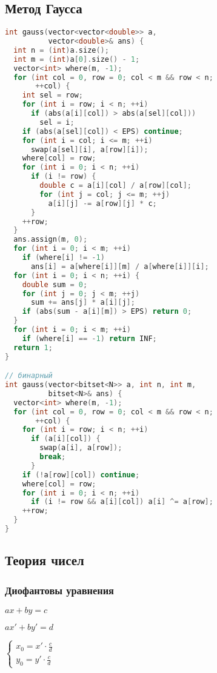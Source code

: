 \documentclass[10pt,a4paper,landscape,twosided]{extarticle}
\begin{document}
\begin{multicols}{3}
\subsection{Метод Гаусса}
\begin{lstlisting}[language=C++]
int gauss(vector<vector<double>> a,
          vector<double>& ans) {
  int n = (int)a.size();
  int m = (int)a[0].size() - 1;
  vector<int> where(m, -1);
  for (int col = 0, row = 0; col < m && row < n;
       ++col) {
    int sel = row;
    for (int i = row; i < n; ++i)
      if (abs(a[i][col]) > abs(a[sel][col]))
        sel = i;
    if (abs(a[sel][col]) < EPS) continue;
    for (int i = col; i <= m; ++i)
      swap(a[sel][i], a[row][i]);
    where[col] = row;
    for (int i = 0; i < n; ++i)
      if (i != row) {
        double c = a[i][col] / a[row][col];
        for (int j = col; j <= m; ++j)
          a[i][j] -= a[row][j] * c;
      }
    ++row;
  }
  ans.assign(m, 0);
  for (int i = 0; i < m; ++i)
    if (where[i] != -1)
      ans[i] = a[where[i]][m] / a[where[i]][i];
  for (int i = 0; i < n; ++i) {
    double sum = 0;
    for (int j = 0; j < m; ++j)
      sum += ans[j] * a[i][j];
    if (abs(sum - a[i][m]) > EPS) return 0;
  }
  for (int i = 0; i < m; ++i)
    if (where[i] == -1) return INF;
  return 1;
}

// бинарный
int gauss(vector<bitset<N>> a, int n, int m,
          bitset<N>& ans) {
  vector<int> where(m, -1);
  for (int col = 0, row = 0; col < m && row < n;
       ++col) {
    for (int i = row; i < n; ++i)
      if (a[i][col]) {
        swap(a[i], a[row]);
        break;
      }
    if (!a[row][col]) continue;
    where[col] = row;
    for (int i = 0; i < n; ++i)
      if (i != row && a[i][col]) a[i] ^= a[row];
    ++row;
  }
}\end{lstlisting}

\subsection{Теория чисел}

\subsubsection{Диофантовы уравнения}
$ax + by = c$

$ax '+by' = d$

$\begin{cases}x_{0} = x '\cdot\frac{c}{d}\\ y_{0}=y'\cdot\frac{c}{ d }\end{ cases }$


\end{multicols}
\end{document}
